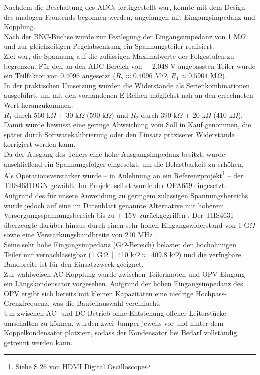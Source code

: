 \documentclass[a4paper, portrait, 12pt]{scrartcl} %
\begin{document}
Nachdem die Beschaltung des ADCs fertiggestellt war, konnte mit dem Design des analogen Frontends begonnen werden, angefangen mit Eingangsimpedanz und Kopplung.\\  
Nach der BNC-Buchse wurde zur Festlegung der Eingangsimpedanz von 1 M$\Omega$ und zur gleichzeitigen Pegelabsenkung ein Spannungsteiler realisiert.\\  
Ziel war, die Spannung auf die zulässigen Maximalwerte der Folgestufen zu begrenzen.  
Für den an den ADC-Bereich von $\pm$ 2.048 V angepassten Teiler wurde ein Teilfaktor von 0.4096 angesetzt ($R_2 \approx 0.4096$ M$\Omega$, $R_1 \approx 0.5904$ M$\Omega$).\\  
In der praktischen Umsetzung wurden die Widerstände als Serienkombinationen ausgeführt, um mit den vorhandenen E-Reihen möglichst nah an den errechneten Wert heranzukommen:\\  
$R_1$ durch 560 k$\Omega$ + 30 k$\Omega$ (590 k$\Omega$) und $R_2$ durch 390 k$\Omega$ + 20 k$\Omega$ (410 k$\Omega$).  
Damit wurde bewusst eine geringe Abweichung vom Soll in Kauf genommen, die später durch Softwarekalibrierung oder den Einsatz präziserer Widerstände korrigiert werden kann.\\  
Da der Ausgang des Teilers eine hohe Ausgangsimpedanz besitzt, wurde anschließend ein Spannungsfolger eingesetzt, um die Belastbarkeit zu erhöhen.\\  
Als Operationsverstärker wurde – in Anlehnung an ein Referenzprojekt\footnote{Siehe S.26 von \href{https://web.mit.edu/6.111/www/f2013/projects/kramnik_Project_Final_Report.pdf}{HDMI Digital Oscilloscope}} – der THS4631DGN gewählt. Im Projekt selbst wurde der OPA659 eingesetzt. Aufgrund des für unsere Anwendung zu geringem zulässigen Spannungsbereichs wurde jedoch auf eine im Datenblatt genannte Alternative mit höherem Versorgungsspannungsbereich bis zu $\pm$ 15V zurückgegriffen \cite[S. 3]{TexasInstruments659}. Der THS4631 überzeugte darüber hinaus durch einen sehr hohen Eingangswiderstand von 1 G$\Omega$ sowie eine Verstärkungsbandbreite von 210 MHz \cite[S. 1]{TexasInstruments4631}.\\  
Seine sehr hohe Eingangsimpedanz (G$\Omega$-Bereich) belastet den hochohmigen Teiler nur vernachlässigbar (1 G$\Omega \parallel$ 410 k$\Omega \approx$ 409.8 k$\Omega$) und die verfügbare Bandbreite ist für den Einsatzzweck geeignet.\\
Zur wahlweisen AC-Kopplung wurde zwischen Teilerknoten und OPV-Eingang ein Längskondensator vorgesehen.  
Aufgrund der hohen Eingangsimpedanz des OPV ergibt sich bereits mit kleinen Kapazitäten eine niedrige Hochpass-Grenzfrequenz, was die Bauteilauswahl vereinfacht.\\ 
Um zwischen AC- und DC-Betrieb ohne Entstehung offener Leiterstücke umschalten zu können, wurden zwei Jumper jeweils vor und hinter dem Koppelkondensator platziert, sodass der Kondensator bei Bedarf vollständig getrennt werden kann.\\
 
\end{document}
